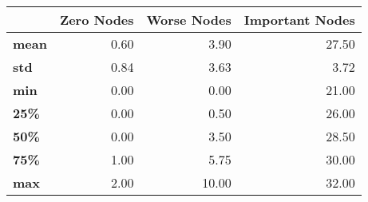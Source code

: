 \begin{tabular}{lrrr}
\toprule
{} &  Zero Nodes &  Worse Nodes &  Important Nodes \\
\midrule
\textbf{mean} &        0.60 &         3.90 &            27.50 \\
\textbf{std } &        0.84 &         3.63 &             3.72 \\
\textbf{min } &        0.00 &         0.00 &            21.00 \\
\textbf{25\% } &        0.00 &         0.50 &            26.00 \\
\textbf{50\% } &        0.00 &         3.50 &            28.50 \\
\textbf{75\% } &        1.00 &         5.75 &            30.00 \\
\textbf{max } &        2.00 &        10.00 &            32.00 \\
\bottomrule
\end{tabular}
